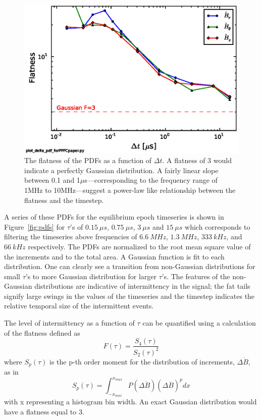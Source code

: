 \documentclass[12pt]{iopart}
\begin{document}
\begin{figure}[!htbp]
\centerline{
\includegraphics[width=16cm]{flatness.eps}}
\caption{\label{fig:flatness} The flatness of the PDFs as a function of $\Delta t$. A flatness of 3 would indicate a perfectly Gaussian distribution. A fairly linear slope between 0.1 and 1$\mu$s---corresponding to the frequency range of 1MHz to 10MHz---suggest a power-law like relationship between the flatness and the timestep.}
\end{figure}

A series of these PDFs for the equilibrium epoch timeseries is shown in Figure~\ref{fig:pdfs} for $\tau$'s of $0.15~\mu s$, $0.75~\mu s$, $3~\mu s$ and $15~\mu s$ which corresponds to filtering the timeseries above frequencies of $6.6~MHz$, $1.3~MHz$, $333~kHz$, and $66~kHz$ respectively. The PDFs are normalized to the root mean square value of the increments and to the total area. A Gaussian function is fit to each distribution. One can clearly see a transition from non-Gaussian distributions for small $\tau$'s to more Gaussian distribution for larger $\tau$'s. The features of the non-Gaussian distributions are indicative of intermittency in the signal; the fat tails signify large swings in the values of the timeseries and the timestep indicates the relative temporal size of the intermittent events.

The level of intermittency as a function of $\tau$ can be quantified using a calculation of the flatness defined as~\cite{deWit13}
\begin{equation}
F(\tau) = \frac{S_{4}(\tau)}{S_{2}(\tau)^{2}}
\label{eq:flatness}
\end{equation}
where $S_{p}(\tau)$ is the p-th order moment for the distribution of increments, $\Delta \dot{B}$, as in
\begin{equation}
S_{p}(\tau) = \int_{-x_{max}}^{x_{max}} P(\Delta \dot{B})(\Delta \dot{B})^{p} dx
\label{eq:structurefunc}
\end{equation}
with x representing a histogram bin width. An exact Gaussian distribution would have a flatness equal to 3.
\end{document}
